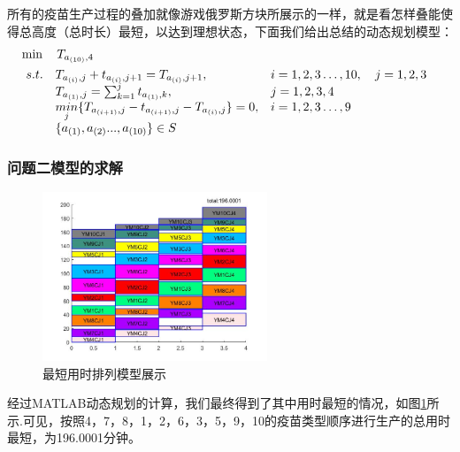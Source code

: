 \documentclass{ctexart}
\begin{document}
所有的疫苗生产过程的叠加就像游戏俄罗斯方块所展示的一样，就是看怎样叠能使得总高度（总时长）最短，以达到理想状态，下面我们给出总结的动态规划模型：
\begin{align*}
&\min \quad T_{a_{(10)},4} \\
& \begin{array}{r@{\quad}l@{}l@{\quad}l}
s.t.& T_{a_{(i)},j} + t_{a_{(i)},j+1} = T_{a_{(i)},j+1}, \quad &i=1,2,3\ldots,10, \quad j=1,2,3\\
    & T_{a_{(1)},j} = \sum_{k = 1}^{j} t_{a_{(1)},k}, &j=1,2,3,4\\
& \mathop{min}\limits_{j} \{T_{a_{(i+1)},j}-t_{a_{(i+1)},j}-T_{a_{(i)},j} \} = 0, \quad &i=1,2,3\ldots,9\\
& \{ a_{(1)} , a_{(2)} ... , a_{(10)} \} \in S
\end{array}
\end{align*}

\subsubsection{问题二模型的求解}

\begin{figure}%
\vspace{-5em}
  \begin{center}
    \includegraphics[width=0.6\textwidth]{A2图片/A1最短.jpg}
  \end{center}
  \label{min}
  \caption{最短用时排列模型展示}
\end{figure}

经过MATLAB动态规划的计算，我们最终得到了其中用时最短的情况，如图\ref{min}所示.可见，按照4，7，8，1，2，6，3，5，9，10的疫苗类型顺序进行生产的总用时最短，为196.0001分钟。
\end{document}
